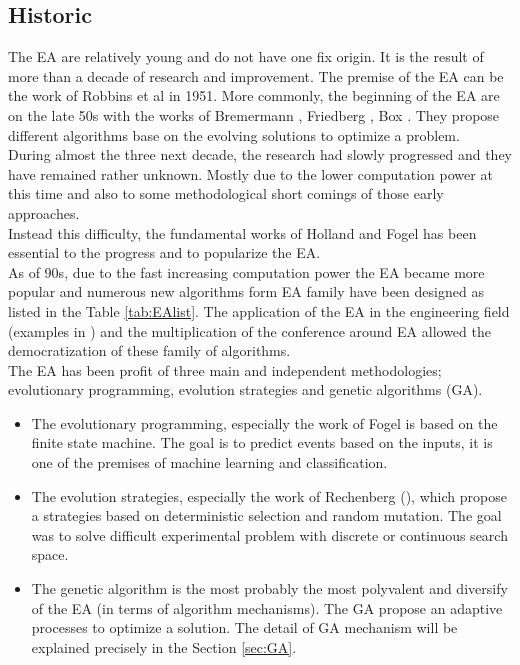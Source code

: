 \subsection{Historic}

The EA are relatively young  and do not have one fix origin. It is the result of more than a decade of research and improvement.
The premise of the EA can be the work of Robbins et al  \cite{184*robbins1951} in 1951. 
More commonly, the beginning of the EA are on the late 50s with the works of Bremermann \cite{185*bremermann1962}, Friedberg \cite{186*friedberg1958}, Box \cite{187*box1957}. They propose different algorithms base on the evolving solutions to optimize a problem.\\ 
During almost the three next decade, the research had slowly progressed and they have remained rather unknown. Mostly due to the lower computation power at this time and also to some methodological short comings of
those early approaches. \\
Instead this difficulty, the fundamental works of Holland \cite{111*Holland1962}  and Fogel  has been essential to the progress and to popularize the EA. \\
As of 90s, due to the fast increasing computation power the EA became more popular and numerous new algorithms form EA family have been designed  as listed in the Table \ref{tab:EAlist}. The application of the EA in the engineering field (examples in \cite{10in182*alander1994}) and the multiplication of the conference around EA allowed the democratization of these family of algorithms.\\
The EA  has been profit of three main and independent methodologies; evolutionary programming, evolution strategies and genetic algorithms (GA). 

\begin{itemize}
\item The evolutionary programming, especially the work of Fogel is based on the finite state machine. The goal is to predict events based on the inputs, it is one of the premises of machine learning and classification.\\ %

\item The evolution strategies, especially the work of  Rechenberg (\cite{rechenberg1965}), which propose a strategies based on deterministic selection and random mutation. The goal was to solve difficult experimental problem with discrete or continuous search space. \\ 

\item The genetic algorithm is the most probably the most polyvalent and diversify of the EA (in terms of algorithm mechanisms). The GA propose  an adaptive processes to optimize a solution. The detail of GA mechanism will be explained precisely in the Section \ref{sec:GA}.\\  
\end{itemize}

